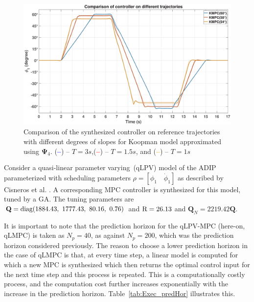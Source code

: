 % 
\begin{figure}[H]
    \centering
    \includegraphics[width=1\linewidth]{figures/Cont_diffTraj}
    \caption{Comparison of the synthesized controller on reference trajectories with different degrees of slopes for Koopman model approximated using $\mathbf{\Psi}_4$. (\textcolor{blue}{\textbf{--}}) -- $T = 3s$,(\textcolor{red}{\textbf{--}}) -- $T = 1.5s$, and (\textcolor{orange}{\textbf{--}}) -- $T = 1s$}
    \label{fig: cont_traj}
\end{figure}
% 
Consider a quasi-linear parameter varying~(qLPV) model of the ADIP parameterized with scheduling parameters $\rho = [\phi_1 \quad \Dot{\phi}_1]$ as described by Cisneros et al. \cite{qLMPC}. A corresponding MPC controller is synthesized for this model, tuned by a GA. The tuning parameters are $\mathbf{Q} = \textup{diag}(1884.43,~1777.43,~80.16,~0.76)$ and $\textup{R} = 26.13$ and $\mathbf{Q}_N = 2219.42\mathbf{Q}$.\par
It is important to note that the prediction horizon for the qLPV-MPC (here-on, qLMPC) is taken as $N_p = 40$, as against $N_p = 200$, which was the prediction horizon considered previously. The reason to choose a lower prediction horizon in the case of qLMPC is that, at every time step, a linear model is computed for which a new MPC is synthesized which then returns the optimal control input for the next time step and this process is repeated. This is a computationally costly process, and the computation cost further increases exponentially with the increase in the prediction horizon. Table~\ref{tab:Exec_predHor} illustrates this. 
